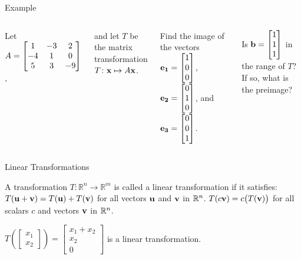 \documentclass[xcolor=dvipsnames,aspectratio=169,t]{beamer}
\begin{document}
\begin{frame}{Example}
\medskip

  \begin{columns}
    \column{0.3\tw}
  Let $A=\displaystyle \begin{bmatrix} 1 & -3 & 2\\
    -4 & 1 & 0\\
    5 & 3 & -9 \end{bmatrix}$,
    \medskip
    
    and let $T$ be the matrix transformation $T\colon \mathbf{x} \mapsto A\mathbf{x}$.
    
  \column{0.7\tw}

  {\small
  \bb
  \vspace*{-2.5em}
  \ii Find the image of the vectors $\displaystyle \mathbf{e_1} = \begin{bmatrix} 1\\0\\0 \end{bmatrix}$, $\displaystyle \mathbf{e_2} = \begin{bmatrix} 0\\1\\0 \end{bmatrix}$, and $\displaystyle \mathbf{e_3} = \begin{bmatrix} 0\\0\\1 \end{bmatrix}$.%
  \vspace*{6em}
  
  \pause
  \ii Is $\displaystyle \mathbf{b} = \begin{bmatrix}1\\1\\1 \end{bmatrix}$ in the range of $T$? If so, what is the preimage?
  \ee}

  \end{columns}
\vspace{3in}

\end{frame}

\begin{frame}{Linear Transformations}

  \bbox
 A transformation $T: \mathbb{R}^n \to \mathbb{R}^m$ is called a \alert{linear transformation} if it satisfies:
  \bb
  \ii $T( \mathbf{u} + \mathbf{v} ) = T(\mathbf{u})+ T(\mathbf{v})$ \alert{for all} vectors $\mathbf{u}$ and $\mathbf{v}$ in $\mathbb{R}^n$.
  \ii $T(c \mathbf{v}) = c \big( T(\mathbf{v}) \big)$ \alert{for all} scalars $c$ and vectors $\mathbf{v}$ in $\mathbb{R}^n$.
  \ee
  \ebox
  \bigskip
  
  \pause
  $T\left(\begin{bmatrix} x_1 \\ x_2 \end{bmatrix}\right)
  =\begin{bmatrix}x_1+x_2 \\ x_2 \\ 0 \end{bmatrix}$ is a linear transformation.

\end{frame}
\end{document}

